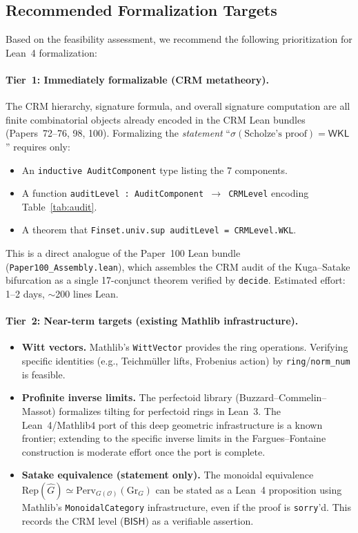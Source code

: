 \documentclass[11pt,a4paper]{article}
\theoremstyle{plain}
\theoremstyle{definition}
\newcommand{\BISH}{\textsf{BISH}}
\newcommand{\WKL}{\textsf{WKL}}
\newcommand{\sig}{\sigma}
\begin{document}
\subsection{Recommended Formalization Targets}

Based on the feasibility assessment, we recommend the following prioritization for Lean~4 formalization:

\paragraph{Tier~1: Immediately formalizable (CRM metatheory).}
The CRM hierarchy, signature formula, and overall signature computation are all finite combinatorial objects already encoded in the CRM Lean bundles (Papers~72--76, 98, 100). Formalizing the \emph{statement} ``$\sig(\text{Scholze's proof}) = \WKL$'' requires only:
\begin{itemize}
\item An \texttt{inductive AuditComponent} type listing the 7 components.
\item A function \texttt{auditLevel : AuditComponent $\to$ CRMLevel} encoding Table~\ref{tab:audit}.
\item A theorem that \texttt{Finset.univ.sup auditLevel = CRMLevel.WKL}.
\end{itemize}
This is a direct analogue of the Paper~100 Lean bundle (\texttt{Paper100\_Assembly.lean}), which assembles the CRM audit of the Kuga--Satake bifurcation as a single 17-conjunct theorem verified by \texttt{decide}. Estimated effort: 1--2 days, $\sim$200 lines Lean.

\paragraph{Tier~2: Near-term targets (existing Mathlib infrastructure).}
\begin{itemize}
\item \textbf{Witt vectors.} Mathlib's \texttt{WittVector} provides the ring operations. Verifying specific identities (e.g., Teichm\"uller lifts, Frobenius action) by \texttt{ring}/\texttt{norm\_num} is feasible.
\item \textbf{Profinite inverse limits.} The perfectoid library (Buzzard--Commelin--Massot) formalizes tilting for perfectoid rings in Lean~3.  The Lean~4/Mathlib4 port of this deep geometric infrastructure is a known frontier; extending to the specific inverse limits in the Fargues--Fontaine construction is moderate effort once the port is complete.
\item \textbf{Satake equivalence (statement only).} The monoidal equivalence $\mathrm{Rep}(\hat{G}) \simeq \mathrm{Perv}_{G(\mathcal{O})}(\mathrm{Gr}_G)$ can be stated as a Lean~4 proposition using Mathlib's \texttt{MonoidalCategory} infrastructure, even if the proof is \texttt{sorry}'d. This records the CRM level ($\BISH$) as a verifiable assertion.
\end{itemize}
\end{document}
